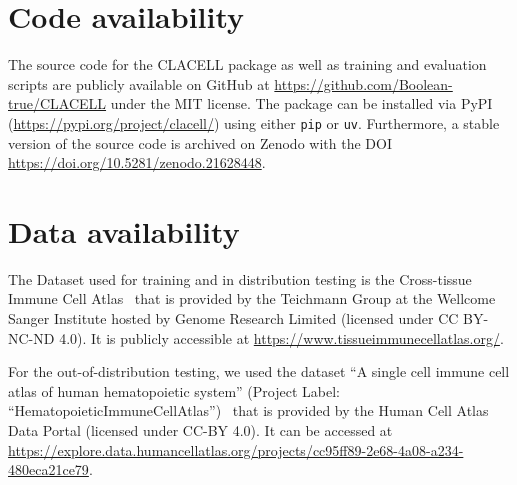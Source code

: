 \documentclass[11pt]{article}
\begin{document}
\section{Code availability}\label{sec:code}

The source code for the CLACELL package as well as training and evaluation scripts are publicly available on GitHub at \url{https://github.com/Boolean-true/CLACELL} under the MIT license. The package can be installed via PyPI (\url{https://pypi.org/project/clacell/}) using either \texttt{pip} or \texttt{uv}. Furthermore, a stable version of the source code is archived on Zenodo with the DOI \url{https://doi.org/10.5281/zenodo.21628448}.


\section{Data availability}\label{sec:data}

The Dataset used for training and in distribution testing is the Cross-tissue Immune Cell Atlas~\cite{dominguez_conde_cross-tissue_2022} that is provided by the Teichmann Group at the Wellcome Sanger Institute hosted by Genome Research Limited (licensed under CC BY-NC-ND 4.0). It is publicly accessible at \url{https://www.tissueimmunecellatlas.org/}.

For the out-of-distribution testing, we used the dataset ``A single cell immune cell atlas of human hematopoietic system'' (Project Label: ``HematopoieticImmuneCellAtlas'')~\cite{Regev2025Hematopoietic} that is provided by the Human Cell Atlas Data Portal (licensed under CC-BY 4.0). It can be accessed at \url{https://explore.data.humancellatlas.org/projects/cc95ff89-2e68-4a08-a234-480eca21ce79}.


\printbibliography

\clearpage
\end{document}
